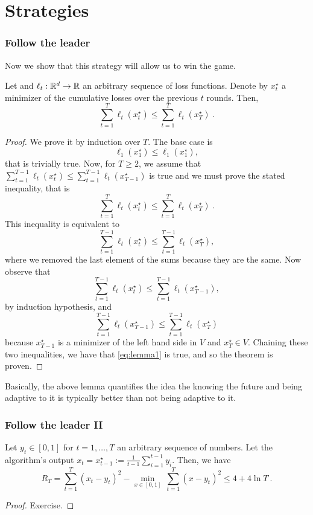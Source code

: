 \documentclass{beamer}
\begin{document}
\section{Strategies}%
\label{sec:}

\begin{frame}
  \frametitle{Follow the leader}
  Now we show that this strategy will allow us to win the game.
  \begin{lemma}
    \label{lemma:be_leader}
    Let  and $\ell_t :\mathbb{R}^d \rightarrow \mathbb{R}$ an arbitrary sequence of loss functions.
    Denote by $x^\star_t$ a minimizer of the cumulative losses over the previous $t$ rounds. Then,
    \[
      \sum_{t=1}^T \ell_t(x^\star_{t}) \leq \sum_{t=1}^T \ell_t(x^\star_{T})~.
    \]
  \end{lemma}
  \begin{proof}
    We prove it by induction over $T$. The base case is
    \[
      \ell_1(x^\star_1) \leq \ell_1(x^\star_{1}),
    \]
    that is trivially true.
    Now, for $T\geq2$, we assume that $\sum_{t=1}^{T-1} \ell_t(x^\star_{t}) \leq \sum_{t=1}^{T-1} \ell_t(x^\star_{T-1})$ is true and we must prove the stated inequality, that is
    \[
      \sum_{t=1}^T \ell_t(x^\star_{t}) \leq \sum_{t=1}^T \ell_t(x^\star_{T})~.
    \]
    This inequality is equivalent to
    \begin{equation}
      \label{eq:lemma1}
      \sum_{t=1}^{T-1} \ell_t(x^\star_{t}) \leq \sum_{t=1}^{T-1} \ell_t(x^\star_{T}),
    \end{equation}
    where we removed the last element of the sums because they are the same.
    Now observe that
    \[
      \sum_{t=1}^{T-1} \ell_t(x^\star_{t}) \leq \sum_{t=1}^{T-1} \ell_t(x^\star_{T-1}),
    \]
    by induction hypothesis, and
    \[
      \sum_{t=1}^{T-1} \ell_t(x^\star_{T-1}) \leq \sum_{t=1}^{T-1} \ell_t(x^\star_{T})
    \]
    because $x^\star_{T-1}$ is a minimizer of the left hand side in $V$ and $x^\star_{T} \in V$.
    Chaining these two inequalities, we have that \eqref{eq:lemma1} is true, and so the theorem is proven.
  \end{proof}
  Basically, the above lemma quantifies the idea the knowing the future and being adaptive to it is typically better than not being adaptive to it.

\end{frame}

\begin{frame}
  \frametitle{Follow the leader II}
  \begin{theorem}
    Let $y_t \in [0,1]$ for $t=1,\dots,T$ an arbitrary sequence of numbers. Let the algorithm's output $x_t=x_{t-1}^\star:=\frac{1}{t-1}\sum_{i=1}^{t-1} y_i$. Then, we have
    \[
      R_T = \sum_{t=1}^T (x_t - y_t)^2 - \min_{x \in [0,1]} \ \sum_{t=1}^T (x - y_t)^2 \leq 4 + 4\ln T~.
    \]
  \end{theorem}
  \begin{proof}
    Exercise.
  \end{proof}

\end{frame}
\end{document}
